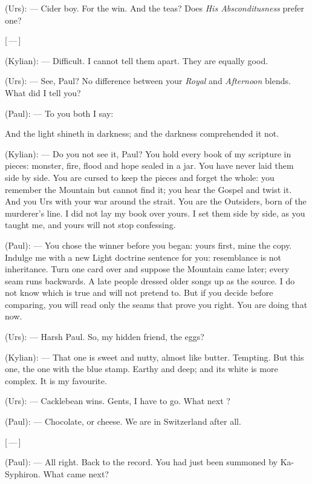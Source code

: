 \begin{room}
(Urs): --- Cider boy. For the win. And the teas? Does \textit{His Absconditusness} prefer one?

\centerline{[\,---\,]}

(Kylian): --- Difficult. I cannot tell them apart. They are equally good.

(Urs): --- See, Paul? No difference between your \textit{Royal} and \textit{Afternoon} blends. What did I tell you?

(Paul): --- To you both I say:

\begin{scripture}

And the light shineth in darkness; and the darkness comprehended it not.

\end{scripture}

(Kylian): --- Do you not see it, Paul? You hold every book of my scripture in pieces: monster, fire, flood and hope sealed in a jar. You have never laid them side by side. You are cursed to keep the pieces and forget the whole: you remember the Mountain but cannot find it; you hear the Gospel and twist it. And you Urs with your war around the strait. You are the Outsiders, born of the murderer's line. I did not lay my book over yours. I set them side by side, as you taught me, and yours will not stop confessing.

(Paul): --- You chose the winner before you began: yours first, mine the copy. Indulge me with a new Light doctrine sentence for you: resemblance is not inheritance. Turn one card over and suppose the Mountain came later; every seam runs backwards. A late people dressed older songs up as the source. I do not know which is true and will not pretend to. But if you decide before comparing, you will read only the seams that prove you right. You are doing that now.

(Urs): --- Harsh Paul. So, my hidden friend, the eggs?

(Kylian): --- That one is sweet and nutty, almost like butter. Tempting. But this one, the one with the blue stamp. Earthy and deep; and its white is more complex. It is my favourite.

(Urs): --- Cacklebean wins. Gents, I have to go. What next ?

(Paul): --- Chocolate, or cheese. We are in Switzerland after all.

\centerline{[\,---\,]}

(Paul): --- All right. Back to the record. You had just been summoned by Ka-Syphiron. What came next?

\end{room}

